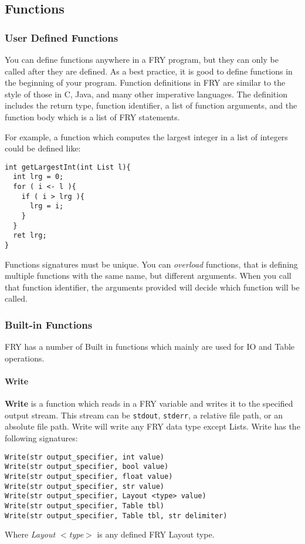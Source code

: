 \documentclass{article}
\begin{document}
\subsection{Functions}
\subsubsection{User Defined Functions}
You can define functions anywhere in a FRY program, but they can only be called after they are defined. As a best practice, it is good to define functions in the beginning of your program. Function definitions in FRY are similar to the style of those in C, Java, and many other imperative languages. The definition includes the return type, function identifier, a list of function arguments, and the function body which is a list of FRY statements. 

For example, a function which computes the largest integer in a list of integers could be defined like:
\begin{lstlisting}
int getLargestInt(int List l){                                                              
  int lrg = 0;
  for ( i <- l ){
    if ( i > lrg ){
      lrg = i;
    }
  }
  ret lrg;
}
\end{lstlisting}

Functions signatures must be unique. You can \emph{overload} functions, that is defining multiple functions with the same name, but different arguments. When you call that function identifier, the arguments provided will decide which function will be called.
\subsubsection{Built-in Functions}
FRY has a number of Built in functions which mainly are used for IO and Table operations.
\paragraph{Write}
\textbf{Write} is a function which reads in a FRY variable and writes it to the specified output stream. This stream can be \texttt{stdout}, \texttt{stderr}, a relative file path, or an absolute file path. Write will write any FRY data type except Lists. Write has the following signatures:
\begin{lstlisting}
Write(str output_specifier, int value)
Write(str output_specifier, bool value)
Write(str output_specifier, float value)
Write(str output_specifier, str value)
Write(str output_specifier, Layout <type> value)
Write(str output_specifier, Table tbl)
Write(str output_specifier, Table tbl, str delimiter)
\end{lstlisting}
Where \emph{Layout $<$type$>$} is any defined FRY Layout type.
   
\end{document}
